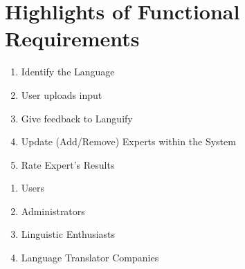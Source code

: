 \section{Highlights of Functional Requirements}
\label{sec:functional_requirements}


\begin{enumerate}[{\bf BE}1:]
	\item Identify the Language
	\item User uploads input	
	\item Give feedback to Languify
	\item Update (Add/Remove) Experts within the System
	\item Rate Expert's Results
\end{enumerate}

\begin{enumerate}[{\bf VP}1:]
	\item Users
	\item Administrators
	\item Linguistic Enthusiasts
	\item Language Translator Companies
\end{enumerate}



\begin{enumerate}[{\bf BE1:}]


	
	

	

	

	


	


	
\end{enumerate}